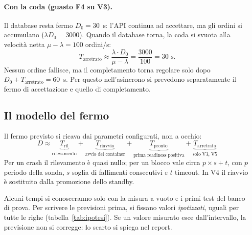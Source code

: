 \paragraph{Con la coda (guasto F4 su V3).} Il database resta fermo $D_0 = 30$~s: l'API continua ad accettare, ma gli ordini si accumulano ($\lambda D_0 = 3000$). Quando il database torna, la coda si svuota alla velocità netta $\mu - \lambda = 100$ ordini/s:
\[
T_{\text{arretrato}} \approx \frac{\lambda \cdot D_0}{\mu - \lambda} = \frac{3000}{100} = 30 \text{ s.}
\]
Nessun ordine fallisce, ma il completamento torna regolare solo dopo $D_0 + T_{\text{arretrato}} = 60$~s. Per questo nell'asincrono si prevedono separatamente il fermo di accettazione e quello di completamento.

\subsection{Il modello del fermo}

Il fermo previsto si ricava dai parametri configurati, non a occhio:
\begin{equation}
  D \approx \underbrace{T_{\text{ril}}}_{\text{rilevamento}} + \underbrace{T_{\text{riavvio}}}_{\text{avvio del container}} + \underbrace{T_{\text{pronto}}}_{\text{prima readiness positiva}} + \underbrace{T_{\text{arretrato}}}_{\text{solo V3, V5}}
  \label{eq:fermo}
\end{equation}
Per un crash il rilevamento è quasi nullo; per un blocco vale circa $p \times s + t$, con $p$ periodo della sonda, $s$ soglia di fallimenti consecutivi e $t$ timeout. In V4 il riavvio è sostituito dalla promozione dello standby.

Alcuni tempi si conosceranno solo con la misura a vuoto e i primi test del banco di prova. Per scrivere le previsioni prima, si fissano valori \emph{ipotizzati}, uguali per tutte le righe (tabella~\ref{tab:ipotesi}). Se un valore misurato esce dall'intervallo, la previsione non si corregge: lo scarto si spiega nel report.

